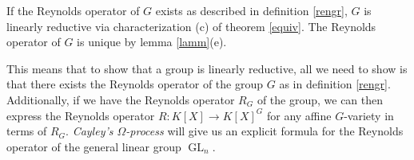 \begin{corollary}
  If the Reynolds operator of $G$ exists as described in definition \ref{rengr}, $G$ is linearly reductive via characterization (c) of theorem \ref{equiv}.
  The Reynolds operator of $G$ is unique by lemma \ref{lamm}(e).
\end{corollary}

This means that to show that a group is linearly reductive, all we need to show is that there exists the Reynolds operator of the group $G$ as in definition \ref{rengr}.
Additionally, if we have the Reynolds operator $R_G$ of the group, we can then express the Reynolds operator $R \colon K[X] \rightarrow K[X]^G$ for any affine $G$-variety in terms of $R_G$.
\textit{Cayley's $\Omega$-process} will give us an explicit formula for the Reynolds operator of the general linear group $\operatorname{GL}_n$.
